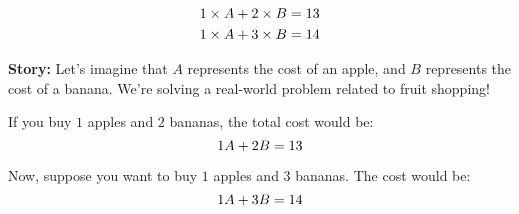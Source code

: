 \documentclass[12pt]{article}
\begin{document}
\newcommand{\valA}{11} %
\newcommand{\valB}{1} %
\newcommand{\valp}{1} %
\newcommand{\valq}{2} %
\newcommand{\valr}{3} %

\newcommand{\valC}{\the\numexpr\valp*\valA+\valq*\valB\relax} %
\newcommand{\valD}{\the\numexpr\valp*\valA+\valr*\valB\relax} %

\begin{center}
\Large
\begin{align*}
\valp \times A + \valq \times B &= \valC \\
\valp \times A + \valr \times B &= \valD
\end{align*}
\end{center}

\vspace{1cm}
\textbf{Story:} Let's imagine that \(A\) represents the cost of an apple, and \(B\) represents the cost of a banana. We're solving a real-world problem related to fruit shopping!

If you buy \(\valp\) apples and \(\valq\) bananas, the total cost would be:
\[\valp A + \valq B = \valC\]

Now, suppose you want to buy \(\valp\) apples and \(\valr\) bananas. The cost would be:
\[\valp A + \valr B = \valD\]

\vspace{2cm}
\pgfmathsetmacro{\heightA}{\valp*\valA} %
\pgfmathsetmacro{\heightB}{\valq*\valB} %
\pgfmathsetmacro{\heightC}{\valr*\valB} %

\newcommand{\maxHeight}{4} %

\pgfmathsetmacro{\scaleFactor}{\maxHeight / \totalHeight}

\pgfmathsetmacro{\scaledHeightA}{\scaleFactor*\heightA} %
\pgfmathsetmacro{\scaledHeightB}{\scaleFactor*\heightB} %
\pgfmathsetmacro{\scaledHeightC}{\scaleFactor*\heightC} %
\end{document}
